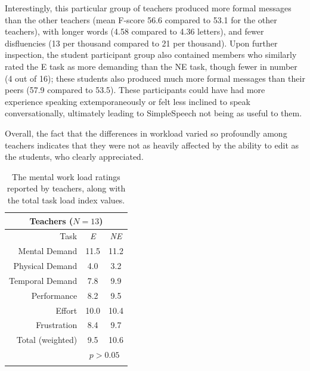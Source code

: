Interestingly, this particular group of teachers produced more formal messages than the other teachers (mean F-score 56.6 compared to 53.1 for the other teachers), with longer words (4.58 compared to 4.36 letters), and fewer disfluencies (13 per thousand compared to 21 per thousand).
Upon further inspection, the student participant group also contained members who similarly rated the E task as more demanding than the NE task, though fewer in number (4 out of 16); these students also produced much more formal messages than their peers (57.9 compared to 53.5). 
These participants could have had more experience speaking extemporaneously or felt less inclined to speak conversationally, ultimately leading to SimpleSpeech not being as useful to them.

Overall, the fact that the differences in workload varied so profoundly among teachers indicates that they were not as heavily affected by the ability to edit as the students, who clearly appreciated.

\begin{table}
	\centering
	\begin{tabular}{r c c}
		\multicolumn{3}{c}{\textbf{Teachers} ($N=13$)} \\
		\toprule
		Task			& \textit{E} & \textit{NE} \\
		Mental Demand    & 11.5 & 11.2 \\
		Physical Demand  & 4.0  & 3.2  \\
		Temporal Demand  & 7.8  & 9.9  \\
		Performance      & 8.2  & 9.5  \\
		Effort           & 10.0 & 10.4 \\
		Frustration      & 8.4  & 9.7  \\
		\midrule
		Total (weighted) & 9.5  & 10.6 \\
		& \multicolumn{2}{c}{$p>0.05$} \\
		\bottomrule \\
	\end{tabular}
	\caption{The mental work load ratings reported by teachers, along with the total task load index values.}~\label{tab:table2}
\end{table}

